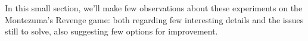 In this small section, we'll make few observations about these experiments on
the Montezuma's Revenge game: both regarding few interesting details and the
issues still to solve, also suggesting few options for improvement.




